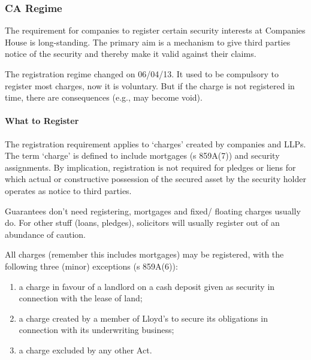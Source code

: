 \documentclass[
]{article}
\providecommand{\tightlist}{%
  \setlength{\itemsep}{0pt}\setlength{\parskip}{0pt}}
\begin{document}
\hypertarget{ca-regime}{%
\subsubsection{CA Regime}\label{ca-regime}}

The requirement for companies to register certain security interests at
Companies House is long-standing. The primary aim is a mechanism to give
third parties notice of the security and thereby make it valid against
their claims.

The registration regime changed on 06/04/13. It used to be compulsory to
register most charges, now it is voluntary. But if the charge is not
registered in time, there are consequences (e.g., may become void).

\hypertarget{what-to-register}{%
\paragraph{What to Register}\label{what-to-register}}

The registration requirement applies to `charges' created by companies
and LLPs. The term `charge' is defined to include mortgages (s 859A(7))
and security assignments. By implication, registration is not required
for pledges or liens for which actual or constructive possession of the
secured asset by the security holder operates as notice to third
parties.

Guarantees don't need registering, mortgages and fixed/ floating charges
usually do. For other stuff (loans, pledges), solicitors will usually
register out of an abundance of caution.

All charges (remember this includes mortgages) may be registered, with
the following three (minor) exceptions (s 859A(6)):

\begin{enumerate}
\def\labelenumi{\arabic{enumi}.}
\tightlist
\item
  a charge in favour of a landlord on a cash deposit given as security
  in connection with the lease of land;
\item
  a charge created by a member of Lloyd's to secure its obligations in
  connection with its underwriting business;
\item
  a charge excluded by any other Act.
\end{enumerate}
\end{document}
